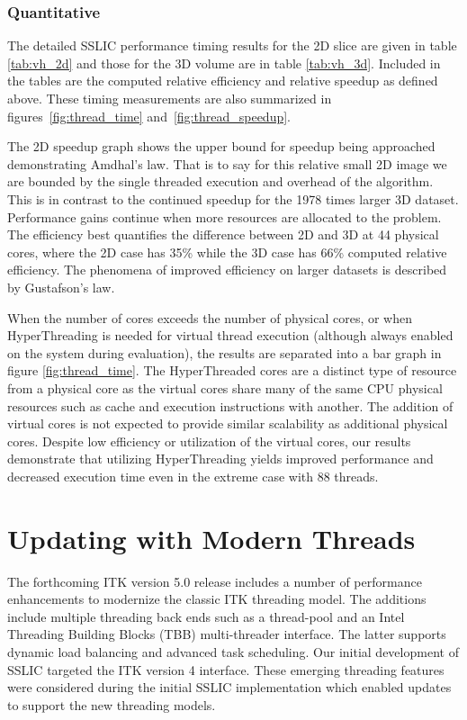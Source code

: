 \documentclass{InsightArticle}
\begin{document}
\subsubsection{Quantitative}

The detailed SSLIC performance timing results for the 2D
slice are given in table \ref{tab:vh_2d} and those for the 3D volume are in table
\ref{tab:vh_3d}. Included in the tables are the
computed relative efficiency and relative speedup as defined above.
These timing measurements are also summarized  in
figures~\ref{fig:thread_time} and~\ref{fig:thread_speedup}.

The 2D speedup graph shows the upper bound for speedup being approached
demonstrating Amdhal's law. That is to say for this relative small 2D image we
are bounded by the single threaded execution and overhead of the algorithm. This
is in contrast to the continued speedup for the 1978 times larger 3D dataset.
Performance gains continue when more resources are allocated to the problem. The
efficiency best quantifies the difference between 2D and 3D at 44 physical
cores, where the 2D case has 35\% while the 3D case has 66\% computed relative
efficiency. The phenomena of improved efficiency on larger datasets is described
by Gustafson's law\cite{Gustafson:1988}.

When the number of cores exceeds the number of physical cores, or when
HyperThreading is needed for virtual thread execution (although always enabled
on the system during evaluation), the results are separated into a bar graph in
figure \ref{fig:thread_time}. The HyperThreaded cores are a distinct type of
resource from a physical core as the virtual cores share many of the same CPU
physical resources such as cache and execution instructions with another. The
addition of virtual cores is not expected to provide  similar scalability
as additional physical cores. Despite low efficiency or utilization of the
virtual cores, our results demonstrate that utilizing HyperThreading yields
improved performance and decreased execution time even in the extreme case with
88 threads.


\section{Updating with Modern Threads}

The forthcoming ITK version 5.0 release includes a number of performance
enhancements to modernize the classic ITK threading model. The additions include
multiple threading back ends such as a thread-pool and an Intel Threading
Building Blocks (TBB) multi-threader interface. The latter supports dynamic load
balancing and advanced task scheduling. Our initial development of SSLIC
targeted the ITK version 4 interface. These emerging threading features were
considered during the initial SSLIC implementation which enabled updates to
support the new threading models.
\end{document}
